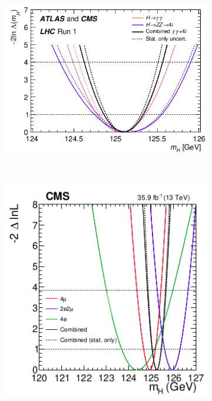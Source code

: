 \documentclass[12pt,a4paper,oneside]{article}
\begin{document}
\begin{linenumbers}
		
		
		\begin{figure}[H]
						
			\centering
			\begin{subfigure}[b]{0.49\textwidth}
				\includegraphics[width=\textwidth]{usporedba1.png}
				\caption{}
				\label{sl:sl91}
			\end{subfigure}	
			~ %
		\begin{subfigure}[b]{0.49\textwidth}
			\includegraphics[width=\textwidth]{usporedba2.png}
			\caption{}
			\label{sl:sl10} 
		\end{subfigure}
			

\end{figure}
\end{linenumbers}
\end{document}
